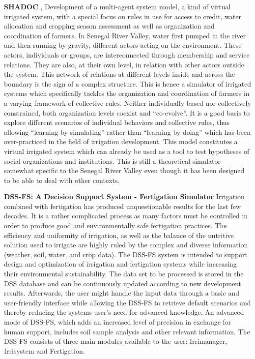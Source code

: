\documentclass[letterpaper, 10 pt, conference]{ieeeconf}  %
\begin{document}
\textbf{SHADOC} \cite{Barreteau2000}, \cite{barreteau2004suitability} Development of a multi-agent system model, a kind of virtual irrigated system, with a special focus on rules in use for access to credit, water allocation and cropping season assessment as well as organization and coordination of farmers.  In Senegal River Valley, water first pumped in the river and then running by gravity, different actors acting on the environment. These actors, individuals or groups, are interconnected through membership and service relations. They are also, at their own level, in relation with other actors outside the system. This network of relations at different levels inside and across the boundary is the sign of a complex structure. This is hence a simulator of irrigated systems which specifically tackles the organization and coordination of farmers in a varying framework of collective rules. Neither individually based nor collectively constrained, both organization levels coexist and “co-evolve”. It is a good basis to explore different scenarios of individual behaviors and collective rules, thus allowing “learning by simulating” rather than “learning by doing” which has been over-practiced in the field of irrigation development. This model constitutes a virtual irrigated system which can already be used as a tool to test hypotheses of social organizations and institutions. This is still a theoretical simulator somewhat specific to the Senegal River Valley even though it has been designed to be able to deal with other contexts. 

\textbf{DSS-FS: A Decision Support System - Fertigation Simulator}\cite{Barradas2012} Irrigation combined with fertigation has produced unquestionable results for the last few decades. It is a rather complicated process as many factors must be controlled in order to produce good and environmentally safe fertigation practices. The efficiency and uniformity of irrigation, as well as the balance of the nutritive solution used to irrigate are highly ruled by the complex and diverse information (weather, soil, water, and crop data). The DSS-FS system is intended to support design and optimization of irrigation and fertigation systems while increasing their environmental sustainability. The data set to be processed is stored in the DSS database and can be continuously updated according to new development results. Afterwards, the user might handle the input data through a basic and user-friendly interface while allowing the DSS-FS to retrieve default scenarios and thereby reducing the systems user’s need for advanced knowledge. An advanced mode of DSS-FS, which adds an increased level of precision in exchange for human support, includes soil sample analysis and other relevant information. The DSS-FS consists of three main modules available to the user: Irrimanager, Irrisystem and Fertigation.
\end{document}

